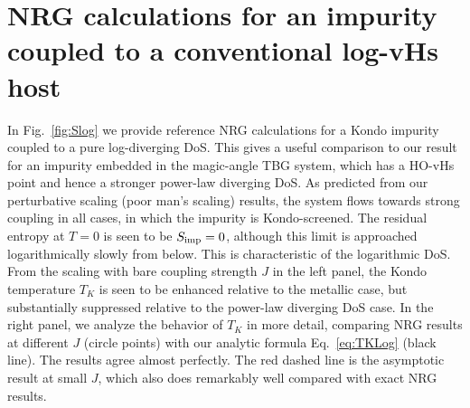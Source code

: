 
\section{NRG calculations for an impurity coupled to a conventional log-vHs host}

In Fig.~\ref{fig:Slog} we provide reference NRG calculations for a Kondo impurity coupled to a pure log-diverging DoS. This gives a useful comparison to our result for an impurity embedded in the magic-angle TBG system, which has a HO-vHs point and hence a stronger power-law diverging DoS. As predicted from our perturbative scaling (poor man's scaling) results, the system flows towards strong coupling in all cases, in which the impurity is Kondo-screened. The residual entropy at $T=0$ is seen to be $S_{\rm imp}=0$, although this limit is approached logarithmically slowly from below. This is characteristic of the logarithmic DoS. From the scaling with bare coupling strength $J$ in the left panel, the Kondo temperature $T_K$ is seen to be enhanced relative to the metallic case, but substantially suppressed relative to the power-law diverging DoS case. In the right panel, we analyze the behavior of $T_K$ in more detail, comparing NRG results at different $J$ (circle points) with our analytic formula Eq.~\ref{eq:TKLog} (black line). The results agree almost perfectly. The red dashed line is the asymptotic result at small $J$, which also does remarkably well compared with exact NRG results.



